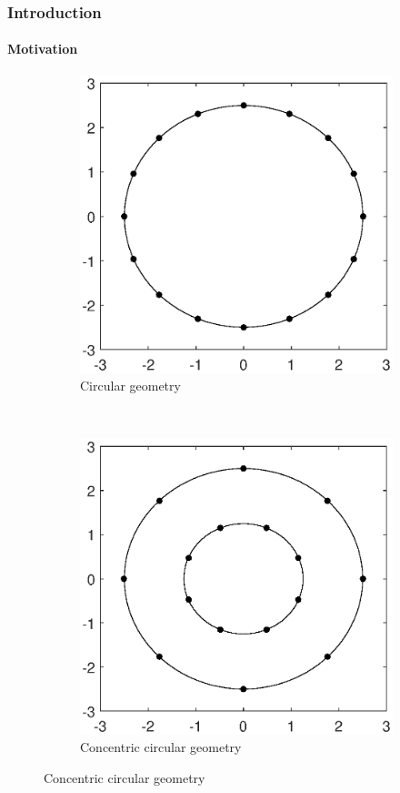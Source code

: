 \documentclass{beamer}
\theoremstyle{remark}
\begin{document}
\begin{frame}
\frametitle{Introduction}
\framesubtitle{Motivation}
\begin{figure}[h!]
    \centering
    \begin{subfigure}[t]{0.5\columnwidth}
        \centering
         \includegraphics[scale=.25]{LedArrangementCircle}
        \caption{Circular geometry}
\label{fig1:subfig1}        
    \end{subfigure}%
    ~ 
    \begin{subfigure}[t]{0.5\columnwidth}
        \centering
        \includegraphics[scale=.25]{LedArrangementConcircle}
        \caption{Concentric circular geometry}
\label{fig1:subfig2}
    \end{subfigure}


\end{figure}
\end{frame}
\end{document}
